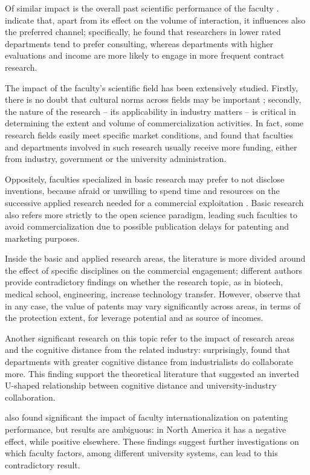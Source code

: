 Of similar impact is the overall past scientific performance of the faculty \citep{OShea2005}. \citep{DEste2011} indicate that, apart from its effect on the volume of interaction, it influences also the preferred channel; specifically, he found that researchers in lower rated departments tend to prefer consulting, whereas departments with higher evaluations and income are more likely to engage in more frequent contract research.

The impact of the faculty's scientific field has been extensively studied. Firstly, there is no doubt that cultural norms across fields may be important \citep{DEste2007}; secondly, the nature of the research – its applicability in industry matters – is critical in determining the extent and volume of commercialization activities. In fact, some research fields easily meet specific market conditions, and \citet{OShea2005} found that faculties and departments involved in such research usually receive more funding, either from industry, government or the university administration.

Oppositely, faculties specialized in basic research may prefer to not disclose inventions, because afraid or unwilling to spend time and resources on the successive applied research needed for a commercial exploitation \citep{Bercovitz2006}. Basic research also refers more strictly to the open science paradigm, leading such faculties to avoid commercialization due to possible publication delays for patenting and marketing purposes. 

Inside the basic and applied research areas, the literature is more divided around the effect of specific disciplines on the commercial engagement; different authors provide contradictory findings on whether the research topic, as in biotech, medical school, engineering, increase technology transfer. However, \citet{OwenSmith2001} observe that in any case, the value of patents may vary significantly across areas, in terms of the protection extent, for leverage potential and as source of incomes. 

Another significant research on this topic refer to the impact of research areas and the cognitive distance from the related industry: surprisingly, \citet{Muscio2010} found that departments with greater cognitive distance from industrialists do collaborate more. This finding support the theoretical literature that suggested an inverted U-shaped relationship between cognitive distance and university-industry collaboration.

\citet{Wong2010} also found significant the impact of faculty internationalization on patenting performance, but results are ambiguous: in North America it has a negative effect, while positive elsewhere. These findings suggest further investigations on which faculty factors, among different university systems, can lead to this contradictory result. 

